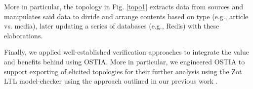 More in particular, the topology in Fig. \ref{topo1} extracts data from sources and manipulates said data to divide and arrange contents based on type (e.g., article vs. media), later updating a series of databases (e.g., Redis) with these elaborations.


Finally, we applied well-established verification approaches to integrate the value and benefits behind using OSTIA. More in particular, we engineered OSTIA to support exporting of elicited topologies for their further analysis using the Zot LTL model-checker \cite{zot} using the approach outlined in our previous work \cite{icsoft}.